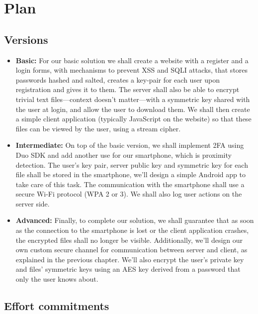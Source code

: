 \documentclass[12pt]{article}
\begin{document}

\newpage
\section{Plan}

\subsection{Versions}

\begin{itemize}
  \item \textbf{Basic:} For our basic solution we shall create a website with a register and a login forms, with mechanisms to prevent XSS and SQLI attacks, that stores passwords hashed and salted, creates a key-pair for each user upon registration and gives it to them. The server shall also be able to encrypt trivial text files---context doesn't matter---with a symmetric key shared with the user at login, and allow the user to download them.  We shall then create a simple client application (typically JavaScript on the website) so that these files can be viewed by the user, using a stream cipher.

  \item \textbf{Intermediate:} On top of the basic version, we shall implement 2FA using Duo SDK and add another use for our smartphone, which is proximity detection. The user's key pair, server public key and symmetric key for each file shall be stored in the smartphone, we'll design a simple Android app to take care of this task. The communication with the smartphone shall use a secure Wi-Fi protocol (WPA 2 or 3). We shall also log user actions on the server side.

  \item \textbf{Advanced:} Finally, to complete our solution, we shall guarantee that as soon as the connection to the smartphone is lost or the client application crashes, the encrypted files shall no longer be visible. Additionally, we'll design our own custom secure channel for communication between server and client, as explained in the previous chapter. We'll also encrypt the user's private key and files' symmetric keys using an AES key derived from a password that only the user knows about.
\end{itemize}

\subsection{Effort commitments}
\end{document}
